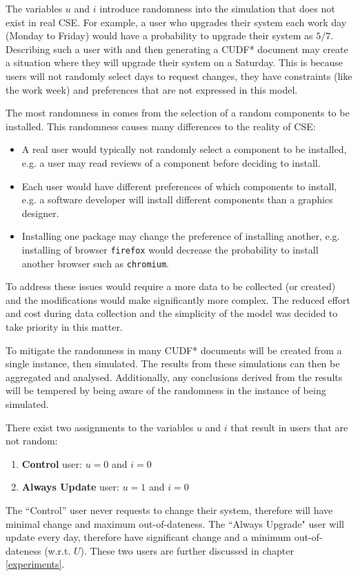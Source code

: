 The variables $u$ and $i$ introduce randomness into the simulation that does not exist in real CSE.
For example, a user who upgrades their system each work day (Monday to Friday) would have a probability to upgrade their system as $5/7$.
Describing such a user with \usermodel and then generating a CUDF* document may create a situation where they will upgrade their system on a Saturday.
This is because users will not randomly select days to request changes, they have constraints (like the work week) and preferences that are not expressed in this model.

The most randomness in \usermodel comes from the selection of a random components to be installed.
This randomness causes many differences to the reality of CSE:
\begin{itemize}
  \item A real user would typically not randomly select a component to be installed, e.g. a user may read reviews of a component before deciding to install.
  \item Each user would have different preferences of which components to install, e.g. a software developer will install different components than a graphics designer.
  \item Installing one package may change the preference of installing another, e.g. installing of browser \texttt{firefox} would decrease the probability to install another browser such as \texttt{chromium}.
\end{itemize}
To address these issues would require a more data to be collected (or created) and the modifications would make \usermodel significantly more complex.
The reduced effort and cost during data collection and the simplicity of the model was decided to take priority in this matter.

To mitigate the randomness in \usermodel many CUDF* documents will be created from a single \usermodel instance, then simulated.
The results from these simulations can then be aggregated and analysed.
Additionally, any conclusions derived from the results will be tempered by being aware of the randomness in the instance of \usermodel being simulated.

There exist two assignments to the variables $u$ and $i$ that result in users that are not random:
\begin{enumerate}
  \item \textbf{Control} user: $u = 0$ and $i = 0$
  \item \textbf{Always Update} user: $u = 1$ and $i = 0$
\end{enumerate}
The ``Control'' user never requests to change their system, therefore will have minimal change and maximum out-of-dateness. 
The ``Always Upgrade" user will update every day, therefore have significant change and a minimum out-of-dateness (w.r.t. $U$).
These two users are further discussed in chapter \ref{experiments}.

